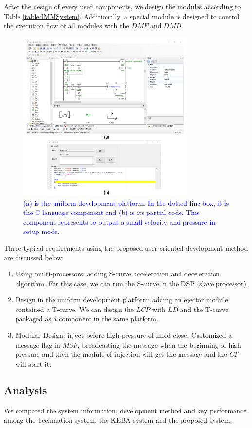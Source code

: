\documentclass[journal,UTF8]{IEEEtran}
\begin{document}
After the design of every used components, we design the modules according to Table \ref{table:IMMSystem}. Additionally, a special module is designed to control the execution flow of all modules with the $DMF$ and $DMD$.

\begin{figure}
	\centering
	\includegraphics[width=3.5in]{fig/ld.pdf}
	\caption{\textcolor{blue}{(a) is the uniform development platform. In the dotted line box, it is the C language component and (b) is its partial code. This component represents to output a small velocity and pressure in setup mode.}}
	\label{fig:ld}
\end{figure}

Three typical requirements using the proposed user-oriented development method are discussed below:
\begin{enumerate}
	\item Using multi-processors: adding S-curve acceleration and deceleration algorithm. For this case, we can run the S-curve in the DSP (slave processor).
	\item Design in the uniform development platform: adding an ejector module contained a T-curve. We can design the $LCP$ with $LD$ and the T-curve packaged as a component in the same platform.
	\item Modular Design: inject before high pressure of mold close. Customized a message flag in $MSF$, broadcasting the message when the beginning of high pressure and then the module of injection will get the message and the $CT$ will start it.
\end{enumerate}
\subsection{Analysis}
We compared the system information, development method and key performance among the Techmation system, the KEBA system and the proposed system.
\end{document}
